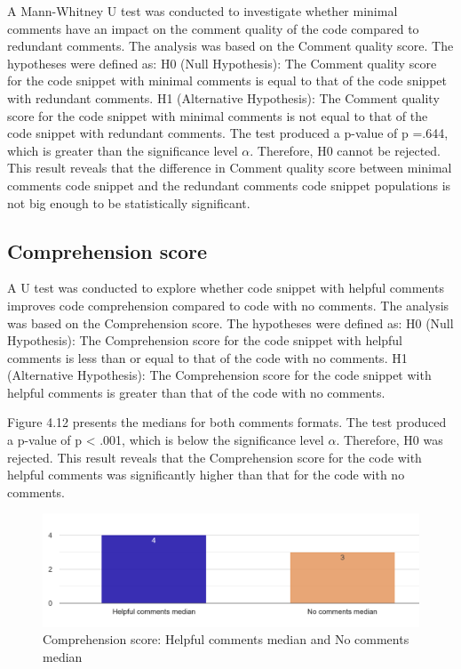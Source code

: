 A Mann-Whitney U test was conducted to investigate whether minimal comments have an impact on the comment quality of the code compared to redundant comments. The analysis was based on the Comment quality score. The hypotheses were defined as: H0 (Null Hypothesis): The Comment quality score for the code snippet with minimal comments is equal to that of the code snippet with redundant comments. H1 (Alternative Hypothesis): The Comment quality score for the code snippet with minimal comments is not equal to that of the code snippet with redundant comments.  The test produced a p-value of p =.644, which is greater than the significance level $\alpha$. Therefore, H0 cannot be rejected. This result reveals that the difference in Comment quality score between minimal comments code snippet and the redundant comments code snippet populations is not big enough to be statistically significant.


\subsection{Comprehension score}
A U test was conducted to explore whether code snippet with helpful comments improves code comprehension compared to code with no comments. The analysis was based on the Comprehension score. The hypotheses were defined as: H0 (Null Hypothesis): The Comprehension score for the code snippet with helpful comments is less than or equal to that of the code with no comments.  H1 (Alternative Hypothesis): The Comprehension score for the code snippet with helpful comments is greater than that of the code with no comments.


Figure 4.12 presents the medians for both comments formats.
The test produced a p-value of  p < .001, which is below the significance level $\alpha $. Therefore, H0 was rejected.  This result reveals that the Comprehension score for the code with helpful comments was significantly higher than that for the code with no comments. 


\begin{figure} [H]
  \centering
  \includegraphics[scale=0.6]{figures/h-0-q3.png}
  \caption{Comprehension score:  Helpful comments median and No comments median}
  \label{fig:AnhangsChor}
\end{figure}




